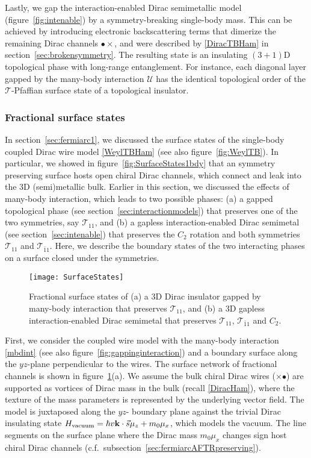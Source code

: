Lastly, we gap the interaction-enabled Dirac semimetallic model (figure~\ref{fig:intenable}) by a symmetry-breaking single-body mass. This can be achieved by introducing electronic backscattering terms that dimerize the remaining Dirac channels {\color{blue}$\bullet\times$}, and were described by \eqref{DiracTBHam} in section~\ref{sec:brokensymmetry}. The resulting state is an insulating $(3+1)$D topological phase with long-range entanglement. For instance, each diagonal layer gapped by the many-body interaction $\mathcal{U}$ has the identical topological order of the $\mathcal{T}$-Pfaffian surface state of a topological insulator. 

\subsubsection{Fractional surface states}\label{sec:fracsurface}

In section~\ref{sec:fermiarc1}, we discussed the surface states of the single-body coupled Dirac wire model \eqref{WeylTBHam} (see also figure~\ref{fig:WeylTB}). In particular, we showed in figure~\ref{fig:SurfaceStates1bdy} that an \AFTR symmetry preserving surface hosts open chiral Dirac channels, which connect and leak into the 3D (semi)metallic bulk. Earlier in this section, we discussed the effects of many-body interaction, which leads to two possible phases: (a) a gapped topological phase (see section~\ref{sec:interactionmodels}) that preserves one of the two \AFTR symmetries, say $\mathcal{T}_{11}$, and (b) a gapless interaction-enabled Dirac semimetal (see section~\ref{sec:intenable}) that preserves the $C_2$ rotation and both \AFTR symmetries $\mathcal{T}_{11}$ and $\mathcal{T}_{\bar{1}1}$. Here, we describe the boundary states of the two interacting phases on a surface closed under the symmetries.

\begin{figure}[htbp]
\centering\texttt{[image: SurfaceStates]}
\caption{Fractional surface states of (a) a 3D Dirac insulator gapped by many-body interaction that preserves $\mathcal{T}_{11}$, and (b) a 3D gapless interaction-enabled Dirac semimetal that preserves $\mathcal{T}_{11}$, $\mathcal{T}_{\bar{1}1}$ and $C_2$.}\label{fig:SurfaceStates}
\end{figure}

First, we consider the coupled wire model with the many-body interaction \eqref{mbdint} (see also figure~\ref{fig:gappinginteraction}) and a boundary surface along the $yz$-plane perpendicular to the wires. The surface network of fractional channels is shown in figure~\ref{fig:SurfaceStates}(a). We assume the bulk chiral Dirac wires ({\color{blue}$\times$}{\color{red}$\bullet$}) are supported as vortices of Dirac mass in the bulk (recall \eqref{DiracHam}), where the texture of the mass parameters is represented by the underlying vector field. The model is juxtaposed along the $yz$- boundary plane against the trivial Dirac insulating state $H_{\mathrm{vacuum}}=\hbar v{\bf k}\cdot\vec{s}\mu_z+m_0\mu_x$, which models the vacuum. The line segments on the surface plane where the Dirac mass $m_0\mu_x$ changes sign host chiral Dirac channels (c.f.~subsection~\ref{sec:fermiarcAFTRpreserving}).

